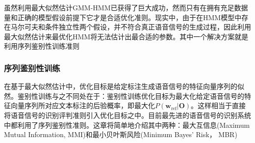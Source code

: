 虽然利用最大似然估计GMM-HMM已获得了巨大成功，然而只有在拥有充足数据量和正确的模型假设前提下它才是合适优化准则。现实中，由于在HMM模型中存在马尔可夫和条件独立性两个假设，并不符合真正语音信号的生成过程，因此利用最大似然估计来最优化HMM将无法估计出最合适的参数。其中一个解决方案就是利用序列鉴别性训练准则~\cite{bahl1986maximum,schluter2001comparison,chou1993minimum,goel2000minimum,juang1997minimum,povey2005discriminative,povey2001improved}

\subsubsection{序列鉴别性训练}
在基于最大似然估计中，优化目标是给定标注生成语音信号的特征向量序列的似然。鉴别性训练与之不同处在于：鉴别性训练优化目标为最大化给定语音信号的特征向量序列所对应文本标注的后验概率，即最大化$P(\mathbf{w}_{\text{ref}}|\mathbf{O})$。这样相当于直接将语音信号的识别评判准则引入优化目标之中。目前最先进的语音信号的识别系统中都利用了序列鉴别性准则。这章将简单地介绍其中两种：最大互信息(Maximum Mutual Information, MMI)和最小贝叶斯风险(Minimum Bayes' Risk， MBR)
